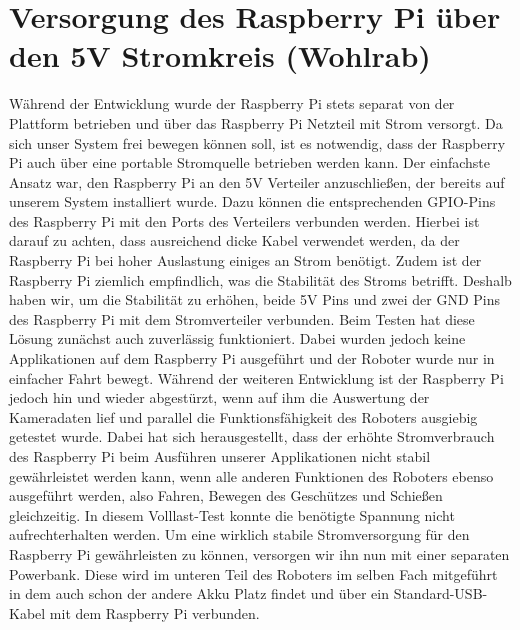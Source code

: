 \section{Versorgung des Raspberry Pi über den 5V Stromkreis (Wohlrab)}

Während der Entwicklung wurde der Raspberry Pi stets separat von der Plattform betrieben und über das Raspberry Pi Netzteil mit Strom versorgt.
Da sich unser System frei bewegen können soll, ist es notwendig, dass der Raspberry Pi auch über eine portable Stromquelle betrieben werden kann.
Der einfachste Ansatz war, den Raspberry Pi an den 5V Verteiler anzuschließen, der bereits auf unserem System installiert wurde.
Dazu können die entsprechenden GPIO-Pins des Raspberry Pi mit den Ports des Verteilers verbunden werden. 
Hierbei ist darauf zu achten, dass ausreichend dicke Kabel verwendet werden, da der Raspberry Pi bei hoher Auslastung einiges an Strom benötigt. 
Zudem ist der Raspberry Pi ziemlich empfindlich, was die Stabilität des Stroms betrifft. 
Deshalb haben wir, um die Stabilität zu erhöhen, beide 5V Pins und zwei der GND Pins des Raspberry Pi mit dem Stromverteiler verbunden.
Beim Testen hat diese Lösung zunächst auch zuverlässig funktioniert. 
Dabei wurden jedoch keine Applikationen auf dem Raspberry Pi ausgeführt und der Roboter wurde nur in einfacher Fahrt bewegt. 
Während der weiteren Entwicklung ist der Raspberry Pi jedoch hin und wieder abgestürzt, wenn auf ihm die Auswertung der Kameradaten lief und parallel die Funktionsfähigkeit des Roboters ausgiebig getestet wurde.
Dabei hat sich herausgestellt, dass der erhöhte Stromverbrauch des Raspberry Pi beim Ausführen unserer Applikationen nicht stabil gewährleistet werden kann, wenn alle anderen Funktionen des Roboters ebenso ausgeführt werden, also Fahren, Bewegen des Geschützes und Schießen gleichzeitig. 
In diesem Volllast-Test konnte die benötigte Spannung nicht aufrechterhalten werden.
Um eine wirklich stabile Stromversorgung für den Raspberry Pi gewährleisten zu können, versorgen wir ihn nun mit einer separaten Powerbank. 
Diese wird im unteren Teil des Roboters im selben Fach mitgeführt in dem auch schon der andere Akku Platz findet und über ein Standard-USB-Kabel mit dem Raspberry Pi verbunden.
